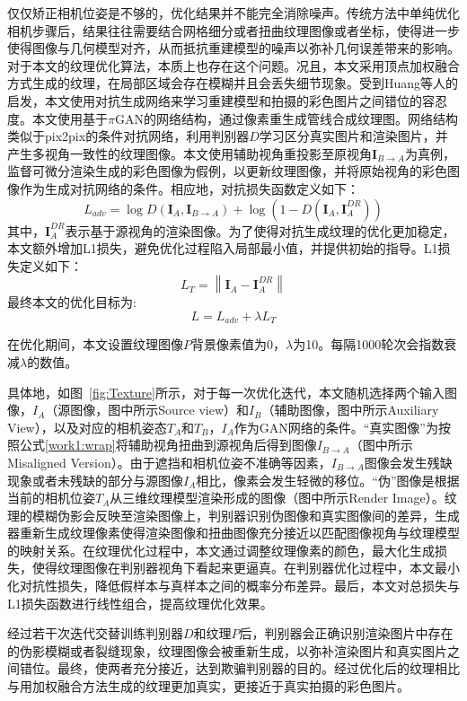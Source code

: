 仅仅矫正相机位姿是不够的，优化结果并不能完全消除噪声。传统方法中单纯优化相机步骤后，结果往往需要结合网格细分或者扭曲纹理图像或者坐标，使得进一步使得图像与几何模型对齐，从而抵抗重建模型的噪声以弥补几何误差带来的影响。对于本文的纹理优化算法，本质上也存在这个问题。况且，本文采用顶点加权融合方式生成的纹理，在局部区域会存在模糊并且会丢失细节现象。受到Huang等人的启发，本文使用对抗生成网络来学习重建模型和拍摄的彩色图片之间错位的容忍度。本文使用基于$\pi$GAN的网络结构，通过像素重生成管线合成纹理图。网络结构类似于pix2pix的条件对抗网络，利用判别器$D$学习区分真实图片和渲染图片，并产生多视角一致性的纹理图像。本文使用辅助视角重投影至原视角$\boldsymbol{I}_{B \rightarrow A}$为真例，监督可微分渲染生成的彩色图像为假例，以更新纹理图像，并将原始视角的彩色图像作为生成对抗网络的条件。相应地，对抗损失函数定义如下：
\begin{equation}
	L_{a d v}=\log D\left(\boldsymbol{I}_{A}, \boldsymbol{I}_{B \rightarrow A}\right)+\log \left(1-D\left(\boldsymbol{I}_{A}, \boldsymbol{I}_{A}^{D R}\right)\right) 
\end{equation}
其中，$\boldsymbol{I}_{A}^{DR}$表示基于源视角的渲染图像。为了使得对抗生成纹理的优化更加稳定，本文额外增加L1损失，避免优化过程陷入局部最小值，并提供初始的指导。L1损失定义如下：
\begin{equation}
L_T = \left \| \boldsymbol{I}_{A}- \boldsymbol{I}_{A}^{D R} \right \| 
\end{equation}
 最终本文的优化目标为:
\begin{equation}
	L = L_{adv} + \lambda L_T \label{texture}
\end{equation}

\noindent 在优化期间，本文设置纹理图像$P$背景像素值为0，$\lambda$为10。每隔1000轮次会指数衰减$\lambda$的数值。\par
具体地，如图~\ref{fig:Texture}所示，对于每一次优化迭代，本文随机选择两个输入图像，$I_A$（源图像，图中所示Source view）和$I_B$（辅助图像，图中所示Auxiliary View），以及对应的相机姿态$T_A$和$T_B$，$I_A$作为GAN网络的条件。“真实图像”为按照公式\ref{work1:wrap}将辅助视角扭曲到源视角后得到图像$I_{B\to A}$（图中所示Misaligned Version）。由于遮挡和相机位姿不准确等因素，$I_{B\to A}$图像会发生残缺现象或者未残缺的部分与源图像$I_A$相比，像素会发生轻微的移位。“伪”图像是根据当前的相机位姿$T_A$从三维纹理模型渲染形成的图像（图中所示Render Image）。纹理的模糊伪影会反映至渲染图像上，判别器识别伪图像和真实图像间的差异，生成器重新生成纹理像素使得渲染图像和扭曲图像充分接近以匹配图像视角与纹理模型的映射关系。在纹理优化过程中，本文通过调整纹理像素的颜色，最大化生成损失，使得纹理图像在判别器视角下看起来更逼真。在判别器优化过程中，本文最小化对抗性损失，降低假样本与真样本之间的概率分布差异。最后，本文对总损失与L1损失函数进行线性组合，提高纹理优化效果。\par
经过若干次迭代交替训练判别器$D$和纹理$P$后，判别器会正确识别渲染图片中存在的伪影模糊或者裂缝现象，纹理图像会被重新生成，以弥补渲染图片和真实图片之间错位。最终，使两者充分接近，达到欺骗判别器的目的。经过优化后的纹理相比与用加权融合方法生成的纹理更加真实，更接近于真实拍摄的彩色图片。\par


